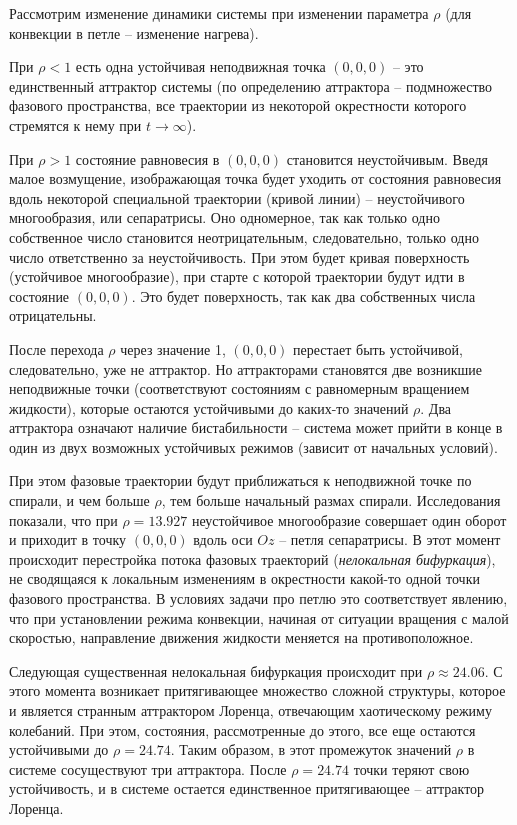 \documentclass[12pt]{article}
\begin{document}
Рассмотрим изменение динамики системы при изменении параметра $\rho$ (для конвекции в петле -- изменение нагрева). 

При $\rho<1$ есть одна устойчивая неподвижная точка $(0, 0, 0)$ -- это единственный аттрактор системы (по определению аттрактора -- подмножество фазового пространства, все траектории из некоторой окрестности которого стремятся к нему при $t \rightarrow \infty$). 

При $\rho>1$ состояние равновесия в $(0, 0, 0)$ становится неустойчивым. Введя малое возмущение, изображающая точка будет уходить от состояния равновесия вдоль некоторой специальной траектории (кривой линии) -- неустойчивого многообразия, или сепаратрисы. Оно одномерное, так как только одно собственное число становится неотрицательным, следовательно, только одно число ответственно за неустойчивость. При этом будет кривая поверхность (устойчивое многообразие), при старте с которой траектории будут идти в состояние $(0, 0, 0)$. Это будет поверхность, так как два собственных числа отрицательны.

После перехода $\rho$ через значение 1, $(0, 0, 0)$ перестает быть устойчивой, следовательно, уже не аттрактор. Но аттракторами становятся две возникшие неподвижные точки (соответствуют состояниям с равномерным вращением жидкости), которые остаются устойчивыми до каких-то значений $\rho$. Два аттрактора означают наличие бистабильности -- система может прийти в конце в один из двух возможных устойчивых режимов (зависит от начальных условий). 

При этом фазовые траектории будут приближаться к неподвижной точке по спирали, и чем больше $\rho$, тем больше начальный размах спирали. Исследования показали, что при $\rho=13.927$ неустойчивое многообразие совершает один оборот и приходит в точку $(0, 0, 0)$ вдоль оси $Oz$ -- петля сепаратрисы. В этот момент происходит перестройка потока фазовых траекторий (\textit{нелокальная бифуркация}), не сводящаяся к локальным изменениям в окрестности какой-то одной точки фазового пространства. В условиях задачи про петлю это соответствует явлению, что при установлении режима конвекции, начиная от ситуации вращения с малой скоростью, направление движения жидкости меняется на противоположное.

Следующая существенная нелокальная бифуркация происходит при $\rho \approx 24.06$. С этого момента возникает притягивающее множество сложной структуры, которое и является странным аттрактором Лоренца, отвечающим хаотическому режиму колебаний. При этом, состояния, рассмотренные до этого, все еще остаются устойчивыми до $\rho=24.74$. Таким образом, в этот промежуток значений $\rho$ в системе сосуществуют три аттрактора. После $\rho=24.74$ точки теряют свою устойчивость, и в системе остается единственное притягивающее -- аттрактор Лоренца.
\end{document}
